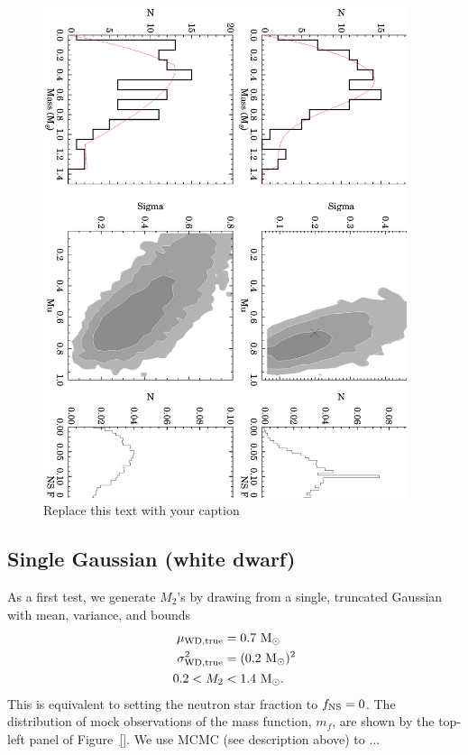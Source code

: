 \documentclass[apjl]{emulateapj}
\newcommand{\Msun}{\ifmmode {{\rm M}_{\odot}}\else M$_{\odot}$\fi}
\begin{document}
\begin{figure}[h!]
\begin{center}
\includegraphics[angle=90,width=0.95\textwidth]{model_post.eps}
\caption{Replace this text with your caption}
\label{fig:tests}
\end{center}
\end{figure}


\subsection{Single Gaussian (white dwarf)} \label{sec:exp1}

As a first test, we generate $M_2$'s by drawing from a single, truncated Gaussian with mean, variance, and bounds
\begin{align}
	\mu_{\rm WD, true} &= 0.7~\Msun\\
	\sigma^2_{\rm WD, true} &= (0.2~\Msun)^2\\
	0.2 < M_2& < 1.4~\Msun.
\end{align}
This is equivalent to setting the neutron star fraction to $f_{\rm NS} = 0$. The distribution of mock observations of the mass function, $m_f$, are shown by the top-left panel of Figure~\ref{}. We use MCMC (see description above) to ... 
\end{document}
